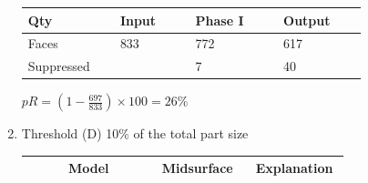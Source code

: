 \begin{enumerate}
\begin{minipage}[c]{0.6\linewidth}
\begin{tabular}[h]{@{} p{0.22\linewidth} p{0.18\linewidth} p{0.21\linewidth} p{0.2\linewidth} @{}}\toprule
\textbf{Qty} & \textbf{Input} & \textbf{Phase I} & \textbf{Output}\\  \midrule
Faces  & 833 & 772 & 617\\
Suppressed  &  &7 & 40\\
\bottomrule
\end{tabular}
\end{minipage}
\begin{minipage}[c]{0.38\linewidth}
$pR = (1 - \frac{697}{833}) \times 100 = 26\%$
\end{minipage}

\item Threshold (D) 10\% of the total part size


\begin{tabular}[h]{@{} p{0.12\linewidth}  p{0.28\linewidth} p{0.28\linewidth} p{0.28\linewidth}@{}}
\toprule
 & Model & Midsurface & Explanation \\
 \midrule
 

\end{tabular}
\end{enumerate}
